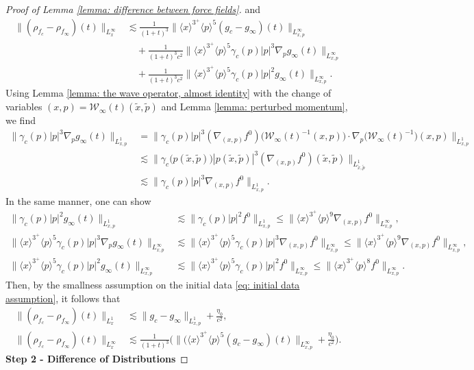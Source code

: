 \documentclass[10pt,a4paper]{amsart}
\begin{document}
\begin{proof}[Proof of Lemma \ref{lemma: difference between force fields}]
and
$$\begin{aligned}
\big\|(\rho_{f_c}-\rho_{f_\infty})(t)\big\|_{L_x^\infty}&\lesssim\frac{1}{(1+t)^3}\Big\|\langle x\rangle^{3^+}\langle p\rangle^{5}(g_c-g_\infty)(t)\Big\|_{L^\infty_{x,p}}\\
&\quad+\frac{1}{(1+t)^3c^2}\Big\|\langle x\rangle^{3^+}\langle p\rangle^{5}\gamma_c(p)|p|^3\nabla_pg_\infty(t)\Big\|_{L^\infty_{x,p}}\\
&\quad+\frac{1}{(1+t)^3c^2}\Big\|\langle x\rangle^{3^+}\langle p\rangle^{5}\gamma_c(p)|p|^2g_\infty(t)\Big\|_{L^\infty_{x,p}}.
\end{aligned}$$
Using Lemma \ref{lemma:  the wave operator, almost identity} with the change of variables $(x,p)=\mathcal{W}_\infty(t)(\tilde{x},\tilde{p})$ and Lemma \ref{lemma: perturbed momentum}, we find
$$\begin{aligned}
\big\|\gamma_c(p)|p|^3\nabla_pg_\infty(t)\big\|_{L_{x,p}^1}&=\Big\|\gamma_c(p)|p|^3(\nabla_{(x,p)}f^0)\Big(\mathcal{W}_\infty(t)^{-1}(x,p)\Big)\cdot\nabla_p\big(\mathcal{W}_\infty(t)^{-1}\big)(x,p)\Big\|_{L_{x,p}^1}\\
&\lesssim \Big\|\gamma_c\big(p(\tilde{x},\tilde{p})\big)|p(\tilde{x},\tilde{p})|^3(\nabla_{(x,p)}f^0)(\tilde{x},\tilde{p})\Big\|_{L_{\tilde{x},\tilde{p}}^1}\\
&\lesssim \big\|\gamma_c(p)|p|^3\nabla_{(x,p)}f^0\big\|_{L_{x,p}^1}.
\end{aligned}$$
In the same manner, one can show
$$\begin{aligned}
\big\|\gamma_c(p)|p|^2g_\infty(t)\big\|_{L_{x,p}^1}&\lesssim \big\|\gamma_c(p)|p|^2f^0\big\|_{L_{x,p}^1}\leq \Big\|\langle x\rangle^{3^+}\langle p\rangle^{9}\nabla_{(x,p)}f^0\Big\|_{L^\infty_{x,p}},\\
\Big\|\langle x\rangle^{3^+}\langle p\rangle^{5}\gamma_c(p)|p|^3\nabla_pg_\infty(t)\Big\|_{L^\infty_{x,p}}&\lesssim \Big\|\langle x\rangle^{3^+}\langle p\rangle^{5}\gamma_c(p)|p|^3\nabla_{(x,p)}f^0\Big\|_{L^\infty_{x,p}}
\leq \Big\|\langle x\rangle^{3^+}\langle p\rangle^{9}\nabla_{(x,p)}f^0\Big\|_{L^\infty_{x,p}},\\
\Big\|\langle x\rangle^{3^+}\langle p\rangle^{5}\gamma_c(p)|p|^2g_\infty(t)\Big\|_{L^\infty_{x,p}}&\lesssim \Big\|\langle x\rangle^{3^+}\langle p\rangle^{5}\gamma_c(p)|p|^2f^0\Big\|_{L^\infty_{x,p}}
\leq \Big\|\langle x\rangle^{3^+}\langle p\rangle^{8}f^0\Big\|_{L^\infty_{x,p}}.
\end{aligned}$$
Then, by the smallness assumption on the initial data \eqref{eq: initial data assumption}, it follows that  
\begin{equation}\label{eq: L1 Linfty rho difference bounds}
\begin{aligned}
\big\|(\rho_{f_c}-\rho_{f_\infty})(t)\big\|_{L_x^1}&\lesssim\|g_c-g_\infty\|_{L_{x,p}^1}+\frac{\eta_0}{c^2},\\
\big\|(\rho_{f_c}-\rho_{f_\infty})(t)\big\|_{L_x^\infty}&\lesssim\frac{1}{(1+t)^3}\bigg(\Big\|\Big(\langle x\rangle^{3^+}\langle p\rangle^5(g_c-g_\infty)(t)\Big\|_{L^\infty_{x,p}}+\frac{\eta_0}{c^2}\bigg).
\end{aligned}
\end{equation}
\textbf{Step 2 - Difference of Distributions} 


\end{proof}
\end{document}
